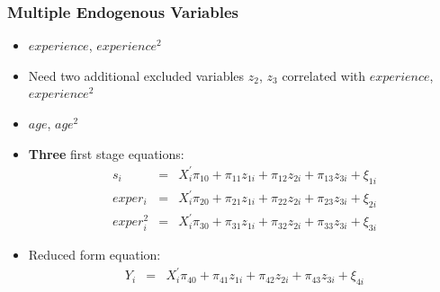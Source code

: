 \documentclass[pdftex]{beamer}
\begin{document}
\begin{frame}
\frametitle{Multiple Endogenous Variables}
\begin{itemize}
\item  $experience$, $experience^{2}$
\item  Need two additional excluded variables $z_{2}$, $z_{3}$ correlated with $experience$, $experience^{2}$
\item $age$, $age^{2}$
\item \textbf{Three} first stage equations:
\begin{eqnarray*}
s_i &=& X_{i}^{'}\pi_{10}+\pi_{11}z_{1i}+\pi_{12}z_{2i}+\pi_{13}z_{3i}+\xi_{1i}\\
exper_i &=& X_{i}^{'}\pi_{20}+\pi_{21}z_{1i}+\pi_{22}z_{2i}+\pi_{23}z_{3i}+\xi_{2i}\\
exper_i^{2} &=&  X_{i}^{'}\pi_{30}+\pi_{31}z_{1i}+\pi_{32}z_{2i}+\pi_{33}z_{3i}+\xi_{3i}
\end{eqnarray*}

\item Reduced form equation:
\begin{eqnarray*}
Y_i &=& X_{i}^{'}\pi_{40}+\pi_{41}z_{1i}+\pi_{42}z_{2i}+\pi_{43}z_{3i}+\xi_{4i}\\
\end{eqnarray*}
\end{itemize}
\end{frame}

 
\end{document}
